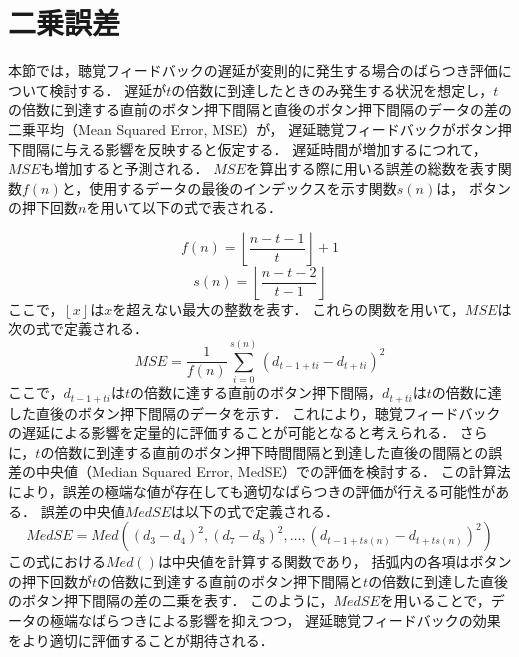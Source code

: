 \section{二乗誤差}
本節では，聴覚フィードバックの遅延が変則的に発生する場合のばらつき評価について検討する．
遅延が$t$の倍数に到達したときのみ発生する状況を想定し，$t$の倍数に到達する直前のボタン押下間隔と直後のボタン押下間隔のデータの差の二乗平均（Mean Squared Error, MSE）が，
遅延聴覚フィードバックがボタン押下間隔に与える影響を反映すると仮定する．
遅延時間が増加するにつれて，$MSE$も増加すると予測される．
$MSE$を算出する際に用いる誤差の総数を表す関数$f(n)$と，使用するデータの最後のインデックスを示す関数$s(n)$は，
ボタンの押下回数$n$を用いて以下の式で表される．

\begin{equation}
f(n) = \left\lfloor \frac{n-t-1}{t} \right\rfloor + 1
\end{equation}
\begin{equation}
s(n) = \left\lfloor \frac{n-t-2}{t-1} \right\rfloor
\end{equation}
ここで，$\left\lfloor x \right\rfloor$は$x$を超えない最大の整数を表す．
これらの関数を用いて，$MSE$は次の式で定義される．
\begin{equation}
MSE = \frac{1}{f(n)} \sum_{i=0}^{s(n)} (d_{t-1+ti} - d_{t+ti})^2
\end{equation}
ここで，$d_{t-1+ti}$は$t$の倍数に達する直前のボタン押下間隔，$d_{t+ti}$は$t$の倍数に達した直後のボタン押下間隔のデータを示す．
これにより，聴覚フィードバックの遅延による影響を定量的に評価することが可能となると考えられる．
さらに，$t$の倍数に到達する直前のボタン押下時間間隔と到達した直後の間隔との誤差の中央値（Median Squared Error, MedSE）での評価を検討する．
この計算法により，誤差の極端な値が存在しても適切なばらつきの評価が行える可能性がある．
誤差の中央値$MedSE$は以下の式で定義される．
\begin{equation}
MedSE = Med((d_{3}-d_{4})^2, (d_{7}-d_{8})^2, \ldots, (d_{t-1+ts(n)}-d_{t+ts(n)})^2)
\end{equation}
この式における$Med()$は中央値を計算する関数であり，
括弧内の各項はボタンの押下回数が$t$の倍数に到達する直前のボタン押下間隔と$t$の倍数に到達した直後のボタン押下間隔の差の二乗を表す．
このように，$MedSE$を用いることで，データの極端なばらつきによる影響を抑えつつ，
遅延聴覚フィードバックの効果をより適切に評価することが期待される．

